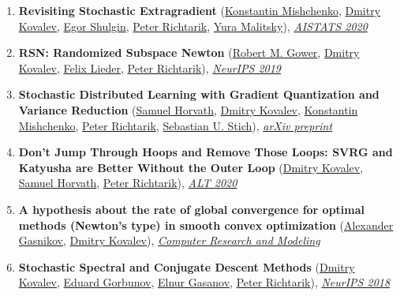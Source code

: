 \begin{enumerate}
\item \textbf{Revisiting Stochastic Extragradient} (\href{https://konstmish.github.io}{\color{linkcolour}Konstantin Mishchenko}, \href{https://www.dmitry-kovalev.com}{\color{linkcolour}Dmitry Kovalev}, \href{https://shulgin-egor.github.io}{\color{linkcolour}Egor Shulgin}, \href{https://richtarik.org}{\color{linkcolour}Peter Richtarik}, \href{https://scholar.google.com/citations?user=GI_-KjoAAAAJ}{\color{linkcolour}Yura Malitsky}), \href{http://proceedings.mlr.press/v108/mishchenko20a}{\em \color{black}AISTATS 2020}
\item \textbf{RSN: Randomized Subspace Newton} (\href{https://gowerrobert.github.io}{\color{linkcolour}Robert M. Gower}, \href{https://www.dmitry-kovalev.com}{\color{linkcolour}Dmitry Kovalev}, \href{http://www.opt.uni-duesseldorf.de/~lieder/de/inhalt.php}{\color{linkcolour}Felix Lieder}, \href{https://richtarik.org}{\color{linkcolour}Peter Richtarik}), \href{https://papers.nips.cc/paper/8351-rsn-randomized-subspace-newton}{\em \color{black}NeurIPS 2019}
\item \textbf{Stochastic Distributed Learning with Gradient Quantization and Variance Reduction} (\href{https://samuelhorvath.github.io}{\color{linkcolour}Samuel Horvath}, \href{https://www.dmitry-kovalev.com}{\color{linkcolour}Dmitry Kovalev}, \href{https://konstmish.github.io}{\color{linkcolour}Konstantin Mishchenko}, \href{https://richtarik.org}{\color{linkcolour}Peter Richtarik}, \href{https://sstich.ch}{\color{linkcolour}Sebastian U. Stich}), \href{https://arxiv.org/abs/1904.05115}{\em \color{black}arXiv preprint}
\item \textbf{Don't Jump Through Hoops and Remove Those Loops: SVRG and Katyusha are Better Without the Outer Loop} (\href{https://www.dmitry-kovalev.com}{\color{linkcolour}Dmitry Kovalev}, \href{https://samuelhorvath.github.io}{\color{linkcolour}Samuel Horvath}, \href{https://richtarik.org}{\color{linkcolour}Peter Richtarik}), \href{http://proceedings.mlr.press/v117/kovalev20a}{\em \color{black}ALT 2020}
\item \textbf{A hypothesis about the rate of global convergence for optimal methods (Newton's type) in smooth convex optimization} (\href{https://scholar.google.ru/citations?user=AmeE8qkAAAAJ}{\color{linkcolour}Alexander Gasnikov}, \href{https://www.dmitry-kovalev.com}{\color{linkcolour}Dmitry Kovalev}), \href{http://crm-en.ics.org.ru/journal/article/2685/}{\em \color{black}Computer Research and Modeling}
\item \textbf{Stochastic Spectral and Conjugate Descent Methods} (\href{https://www.dmitry-kovalev.com}{\color{linkcolour}Dmitry Kovalev}, \href{https://eduardgorbunov.github.io}{\color{linkcolour}Eduard Gorbunov}, \href{https://elnurgasanov.com}{\color{linkcolour}Elnur Gasanov}, \href{https://richtarik.org}{\color{linkcolour}Peter Richtarik}), \href{https://papers.nips.cc/paper/7596-stochastic-spectral-and-conjugate-descent-methods}{\em \color{black}NeurIPS 2018}
\end{enumerate}
